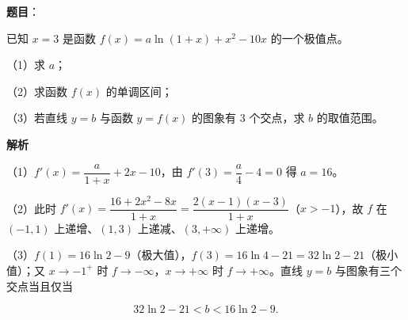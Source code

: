 \begin{answer}

\textbf{题目}：

已知 $x=3$ 是函数 $f(x)=a\ln(1+x)+x^2-10x$ 的一个极值点。

（1）求 $a$；

（2）求函数 $f(x)$ 的单调区间；

（3）若直线 $y=b$ 与函数 $y=f(x)$ 的图象有 $3$ 个交点，求 $b$ 的取值范围。

\textbf{解析}

（1）$f'(x)=\dfrac a{1+x}+2x-10$，由 $f'(3)=\dfrac a4-4=0$ 得 $a=16$。

（2）此时 $f'(x)=\dfrac{16+2x^2-8x}{1+x}=\dfrac{2(x-1)(x-3)}{1+x}$（$x>-1$），故 $f$ 在 $(-1,1)$ 上递增、$(1,3)$ 上递减、$(3,+\infty)$ 上递增。

（3）$f(1)=16\ln2-9$（极大值），$f(3)=16\ln4-21=32\ln2-21$（极小值）；又 $x\to-1^+$ 时 $f\to-\infty$，$x\to+\infty$ 时 $f\to+\infty$。直线 $y=b$ 与图象有三个交点当且仅当

\nopagebreak[4]
\[32\ln2-21<b<16\ln2-9.\]


\end{answer}